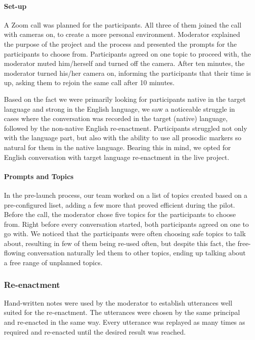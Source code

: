 \paragraph{\textbf{Set-up}}
A Zoom call was planned for the participants. All three of them joined the call with cameras on, to create a more personal environment. Moderator explained the purpose of the project and the process and presented the prompts for the participants to choose from. Participants agreed on one topic to proceed with, the moderator muted him/herself and turned off the camera. After ten minutes, the moderator turned his/her camera on, informing the participants that their time is up, asking them to rejoin the same call after 10 minutes.

Based on the fact we were primarily looking for participants native in the target language and strong in the English language, we saw a noticeable struggle in cases where the conversation was recorded in the target (native) language, followed by the non-native English re-enactment. Participants struggled not only with the language part, but also with the ability to use all prosodic markers so natural for them in the native language. Bearing this in mind, we opted for English conversation with target language re-enactment in the live project.

\paragraph{\textbf{Prompts and Topics}}
In the pre-launch process, our team worked on a list of topics created based on a pre-configured liset, adding a few more that proved efficient during the pilot. Before the call, the moderator chose five topics for the participants to choose from. Right before every conversation started, both participants agreed on one to go with. We noticed that the participants were often choosing safe topics to talk about, resulting in few of them being re-used often, but despite this fact, the free-flowing conversation naturally led them to other topics, ending up talking about a free range of unplanned topics.

\subsubsection{Re-enactment}
Hand-written notes were used by the moderator to establish utterances well suited for the re-enactment. The utterances were chosen by the same principal and re-enacted in the same way. Every utterance was replayed as many times as required and re-enacted until the desired result was reached. 

